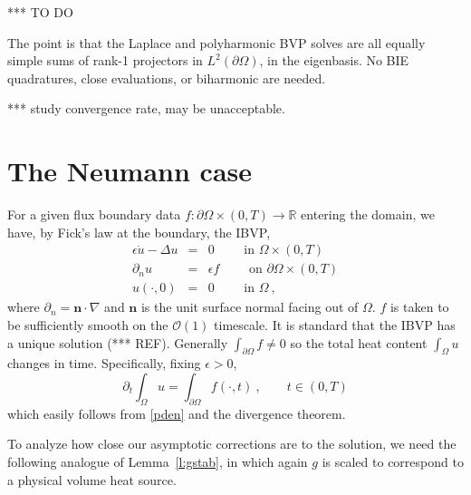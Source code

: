 \documentclass[10pt]{article}
\newcommand{\be}{\begin{equation}}
\newcommand{\ee}{\end{equation}}
\newcommand{\bea}{\begin{eqnarray}}
\newcommand{\eea}{\end{eqnarray}}
\newcommand{\mbf}[1]{{\mathbf #1}}
\newcommand{\R}{\mathbb{R}}
\newcommand{\bigO}{{\mathcal O}}
\newcommand{\pO}{{\partial\Omega}}
\newcommand{\eps}{\epsilon}
\newcommand{\dn}{\partial_n}
\newcommand{\dt}{\partial_t}
\begin{document}
*** TO DO

The point is that the Laplace and polyharmonic BVP solves
are all equally
simple sums of rank-1 projectors in $L^2(\pO)$, in the eigenbasis.
No BIE quadratures, close evaluations, or biharmonic are needed.

*** study convergence rate, may be unacceptable.



\section{The Neumann case}

For a given flux boundary data $f: \pO\times(0,T)\to\R$ entering the domain,
we have, by Fick's law at the boundary, the IBVP,
\bea
\eps\dot{u} - \Delta u &=& 0    \qquad \mbox{ in } \Omega\times (0,T)
\label{pden}
\\
\dn u  &=& \eps f  \qquad \mbox{ on } \pO \times (0,T)
\label{bcn}
\\
u(\cdot, 0)    &=&  0 \qquad \mbox{ in } \Omega~,
\label{icn}
\eea
where $\dn = \mbf{n}\cdot\nabla$ and $\mbf{n}$ is the unit surface
normal facing out of $\Omega$.
$f$ is taken to be sufficiently smooth on the $\bigO(1)$ timescale.
It is standard that the IBVP has a unique solution
(*** REF).
Generally $\int_\pO f \neq 0$ so the total heat content $\int_\Omega u$
changes in time.
Specifically, fixing $\eps>0$,
\be
\dt \int_\Omega u = \int_\pO f(\cdot,t)~, \qquad t\in(0,T)
\label{cons}
\ee
which easily follows from \eqref{pden} and the divergence theorem.

To analyze how close our asymptotic corrections are to the solution, we
need the following analogue of Lemma~\ref{l:gstab}, in which again $g$ is scaled to correspond to a physical volume heat source.
\end{document}
